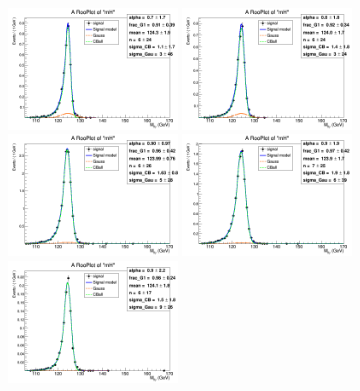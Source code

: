 \begin{figure}
	\begin{center}
		\includegraphics[width=0.40\textwidth]{fig/signal_fit/2018/sigfit_ele_ggF_1_125.png}
		\includegraphics[width=0.40\textwidth]{fig/signal_fit/2018/sigfit_ele_ggF_2_125.png}\\
		\includegraphics[width=0.40\textwidth]{fig/signal_fit/2018/sigfit_ele_ggF_3_125.png}
		\includegraphics[width=0.40\textwidth]{fig/signal_fit/2018/sigfit_ele_ggF_4_125.png}\\
		\includegraphics[width=0.40\textwidth]{fig/signal_fit/2018/sigfit_ele_VBF_501_125.png}

\end{center}
\end{figure}
